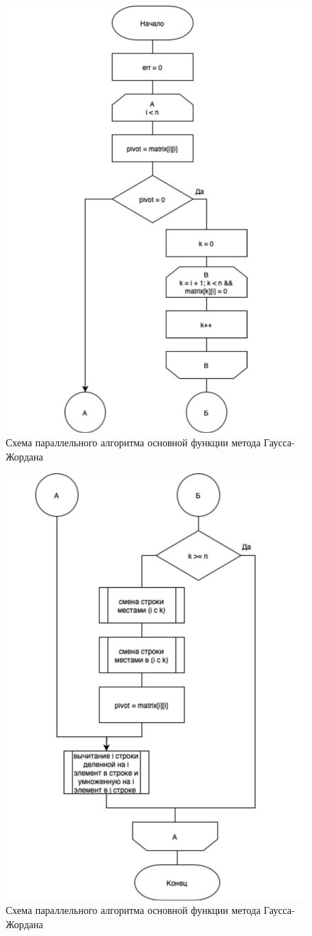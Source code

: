 \begin{figure}[h]
    \centering
    \includegraphics[width=0.7\linewidth]{img/paral1.pdf}
    \caption{Схема параллельного алгоритма основной функции метода Гаусса-Жордана}
    \label{fig:paral1}
\end{figure}

\begin{figure}[h]
    \centering
    \includegraphics[width=0.7\linewidth]{img/paral2.pdf}
    \caption{Схема параллельного алгоритма основной функции метода Гаусса-Жордана}
    \label{fig:paral2}
\end{figure}

